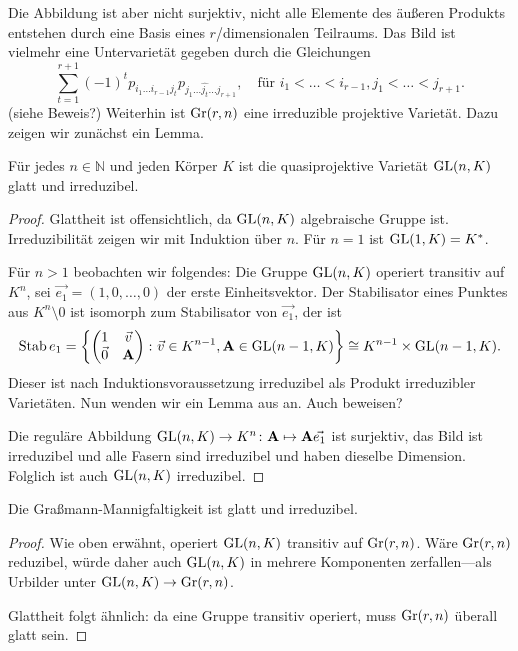 Die Abbildung ist aber nicht surjektiv, nicht alle Elemente des äußeren Produkts entstehen durch eine Basis eines $r$\-/dimensionalen Teilraums. Das Bild ist vielmehr eine Untervarietät gegeben durch die Gleichungen
\begin{equation}
\sum_{t=1}^{r+1} (-1)^t p_{i_1 \dots i_{r-1} j_t} p_{j_1 \dots \hat{j_t} \dots j_{r+1}}, \quad\text{für } i_1 < \dots < i_{r-1}, j_1 < \dots < j_{r+1}.
\end{equation}
(siehe \cite[S.~42]{Shafarevich} \note Beweis?) Weiterhin ist $\grass r/n$ eine irreduzible projektive Varietät. Dazu zeigen wir zunächst ein Lemma.

\begin{prop}
Für jedes $n \in \mathbb N$ und jeden Körper $K$ ist die quasiprojektive Varietät $\mathrm{GL}(n,K)$ glatt und irreduzibel.
\end{prop}
\begin{proof}
Glattheit ist offensichtlich, da $\mathrm{GL}(n,K)$ algebraische Gruppe ist. Irreduzibilität zeigen wir mit Induktion über $n$. Für $n=1$ ist $\mathrm{GL}(1,K) = K^*$.

Für $n>1$ beobachten wir folgendes: Die Gruppe $\mathrm{GL}(n,K)$ operiert transitiv auf $K^n$, sei $\vec{e_1} = (1,0,\dots,0)$ der erste Einheitsvektor. Der Stabilisator eines Punktes aus $K^n \setminus 0$ ist isomorph zum Stabilisator von $\vec{e_1}$, der ist
\begin{equation}
\operatorname{Stab} e_1 = \left\{ \begin{pmatrix}
1 & \vec v \\
\vec 0 & \mathbf{A}
\end{pmatrix} \colon \vec v \in K^{n-1}, \mathbf{A} \in \mathrm{GL}(n-1,K) \right\} \cong K^{n-1} \times \mathrm{GL}(n-1,K).
\end{equation}
Dieser ist nach Induktionsvoraussetzung irreduzibel als Produkt irreduzibler Varietäten. Nun wenden wir ein Lemma aus \cite[S.~77]{Shafarevich} an. \note Auch beweisen?

Die reguläre Abbildung $\mathrm{GL}(n,K) \rightarrow K^n \colon \mathbf{A} \mapsto \mathbf{A} \vec{e_1}$ ist surjektiv, das Bild ist irreduzibel und alle Fasern sind irreduzibel und haben dieselbe Dimension. Folglich ist auch $\mathrm{GL}(n,K)$ irreduzibel.
\end{proof}

\begin{prop}
Die Graßmann-Mannigfaltigkeit ist glatt und irreduzibel.
\end{prop}
\begin{proof}
Wie oben erwähnt, operiert $\mathrm{GL}(n,K)$ transitiv auf $\grass r/n$. Wäre $\grass r/n$ reduzibel, würde daher auch $\mathrm{GL}(n,K)$ in mehrere Komponenten zerfallen---als Urbilder unter $\GL nK \to \grass r/n$.

Glattheit folgt ähnlich: da eine Gruppe transitiv operiert, muss $\grass r/n$ überall glatt sein.
\end{proof}

